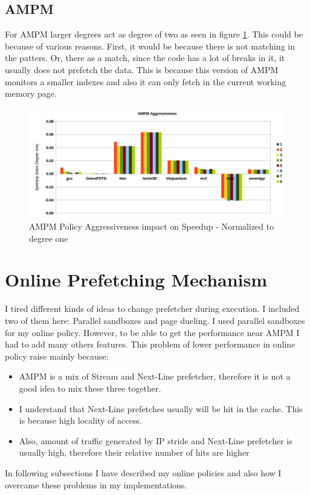 \documentclass{article}
\begin{document}
\subsection{AMPM}
For AMPM larger degrees act as degree of two as seen in figure \ref{pic:ampm-agg}. This could be because of various reasons. First, it would be because there is not matching in the patters. Or, there as a match, since the code has a lot of breaks in it, it usually does not prefetch the data. This is because this version of AMPM monitors a smaller indexes and also it can only fetch in the current working memory page.

\begin{figure}[!h]
  \label{pic:ampm-agg}
  \centering
    \includegraphics[width=1\textwidth]{ampm_agg.png}
    \caption{AMPM Policy Aggressiveness impact on Speedup - Normalized to degree one}
\end{figure}

\section{Online Prefetching Mechanism}
I tired different kinds of ideas to change prefetcher during execution. I included two of them here: Parallel sandboxes and page dueling. I used parallel sandboxes for my online policy. However, to be able to get the performance near AMPM I had to add many others features. This problem of lower performance in online policy raise mainly because:
\begin{itemize}
 \item AMPM is a mix of Stream and Next-Line prefetcher, therefore it is not a good idea to mix these three together.
 \item I understand that Next-Line prefetches usually will be hit in the cache. This is because high locality of access.
 \item Also, amount of traffic generated by IP stride and Next-Line prefetcher is usually high, therefore their relative number of hits are higher 
\end{itemize}
In following subsections I have described my online policies and also how I overcame these problems in my implementations. 
\end{document}
